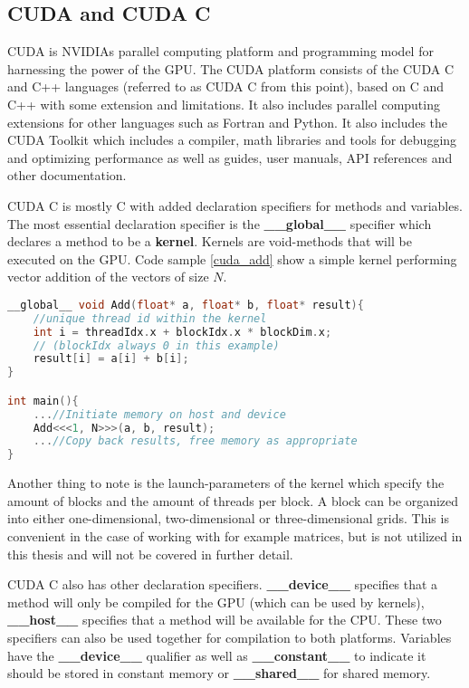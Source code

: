 \subsection{CUDA and CUDA C}
CUDA is NVIDIAs parallel computing platform and programming model for harnessing the power of the GPU.
The CUDA platform consists of the CUDA C and C++ languages (referred to as CUDA C from this point), based on C and C++ with some extension and limitations. It also includes parallel computing extensions for other languages such as Fortran and Python. It also includes the CUDA Toolkit which includes a compiler, math libraries and tools for debugging and optimizing performance as well as guides, user manuals, API references and other documentation.

CUDA C is mostly C with added declaration specifiers for methods and variables. The most essential declaration specifier is the \textbf{\_\_global\_\_} specifier which declares a method to be a \textbf{kernel}. Kernels are void-methods that will be executed on the GPU. Code sample \ref{cuda_add} show a simple kernel performing vector addition of the vectors of size $N$.

\begin{lstlisting}[language=C++, caption=CUDA C addition kernel, label=cuda_add]
__global__ void Add(float* a, float* b, float* result){
	//unique thread id within the kernel
	int i = threadIdx.x + blockIdx.x * blockDim.x;
	// (blockIdx always 0 in this example)
	result[i] = a[i] + b[i];
}

int main(){
	...//Initiate memory on host and device
	Add<<<1, N>>>(a, b, result);
	...//Copy back results, free memory as appropriate
}
\end{lstlisting}

Another thing to note is the launch-parameters of the kernel which specify the amount of blocks and the amount of threads per block. A block can be organized into either one-dimensional, two-dimensional or three-dimensional grids. This is convenient in the case of working with for example matrices, but is not utilized in this thesis and will not be covered in further detail.

CUDA C also has other declaration specifiers. \textbf{\_\_device\_\_} specifies that a method will only be compiled for the GPU (which can be used by kernels), \textbf{\_\_host\_\_} specifies that a method will be available for the CPU. These two specifiers can also be used together for compilation to both platforms.
Variables have the \textbf{\_\_device\_\_} qualifier as well as \textbf{\_\_constant\_\_} to indicate it should be stored in constant memory or \textbf{\_\_shared\_\_} for shared memory.

